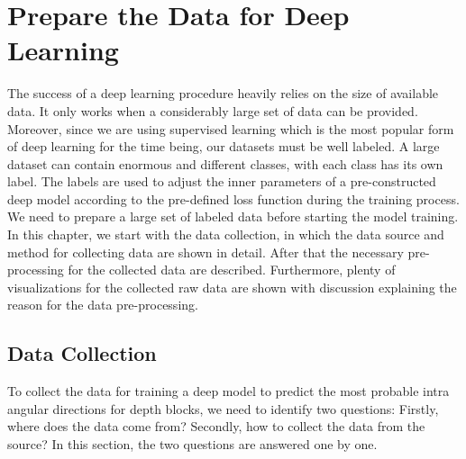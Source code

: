 \chapter{Prepare the Data for Deep Learning}\label{ch:chapter3} %

The success of a deep learning procedure heavily relies
on the size of available data.
It only works when a considerably large set of data can be provided.
Moreover, since we are using supervised learning which is the most
popular form of deep learning for the time being, our datasets
must be well labeled.
A large dataset can contain enormous and different classes,
with each class has its own label.
The labels are used to adjust the inner parameters of a pre-constructed
deep model according to the pre-defined loss function during the training
process.
We need to prepare a large set of labeled data before starting the
model training.
In this chapter, we start with the data collection, in which the data source
and method for collecting data are shown in detail.
After that the necessary pre-processing for the collected data are described.
Furthermore, plenty of visualizations for the collected raw data are shown with
discussion explaining the reason for the data pre-processing.

\section{Data Collection}\label{sec:data-collection}
To collect the data for training a deep model to predict the most probable
intra angular directions for depth blocks, we need to identify two questions:
Firstly, where does the data come from?
Secondly, how to collect the data from the source?
In this section, the two questions are answered one by one.


